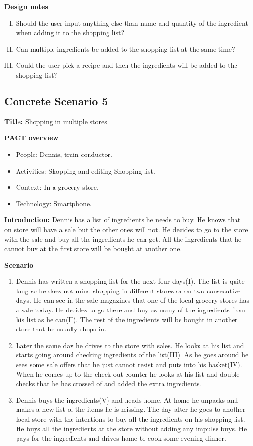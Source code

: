 \textbf{Design notes}

\begin{enumerate} [(I)]
\item Should the user input anything else than name and quantity of the ingredient when adding it to the shopping list? 
\item Can multiple ingredients be added to the shopping list at the same time?  
\item Could the user pick a recipe and then the ingredients will be added to the shopping list?
\end{enumerate}

\subsection{Concrete Scenario 5} \label{ConcreteScenario5}

\textbf{Title:} Shopping in multiple stores.

\textbf{PACT overview}
\begin{itemize}
\item People: Dennis, train conductor. 
\item Activities: Shopping and editing Shopping list.
\item Context: In a grocery store.
\item Technology: Smartphone.
\end{itemize}

\textbf{Introduction:} Dennis has a list of ingredients he needs to buy. He knows that on store will have a sale but the other ones will not. He decides to go to the store with the sale and buy all the ingredients he can get. All the ingredients that he cannot buy at the first store will be bought at another one.

\textbf{Scenario}
\begin{enumerate}
\item Dennis has written a shopping list for the next four days(I). The list is quite long so he does not mind shopping in different stores or on two consecutive days. He can see in the sale magazines that one of the local grocery stores has a sale today. He decides to go there and buy as many of the ingredients from his list as he can(II). The rest of the ingredients will be bought in another store that he usually shops in.    
\item Later the same day he drives to the store with sales. He looks at his list and starts going around checking ingredients of the list(III). As he goes around he sees some sale offers that he just cannot resist and puts into his basket(IV). When he comes up to the check out counter he looks at his list and double checks that he has crossed of and added the extra ingredients. 
\item Dennis buys the ingredients(V) and heads home. At home he unpacks and makes a new list of the items he is missing. The day after he goes to another local store with the intentions to buy all the ingredients on his shopping list. He buys all the ingredients at the store without adding any impulse buys. He pays for the ingredients and drives home to cook some evening dinner.
\end{enumerate}

